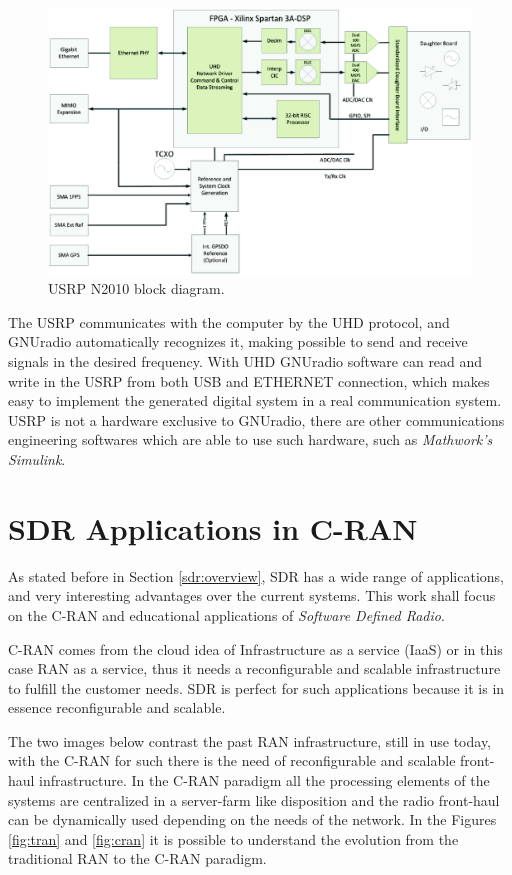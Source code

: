 \begin{figure}[htbp]
    \centering
    \includegraphics[width=.85\textwidth]{./figures/usrp_bd}
    \caption{ USRP N2010 block diagram.
    \label{fig:usrpbd}}
\end{figure}

The USRP communicates with the computer by the UHD protocol, and GNUradio
automatically recognizes it, making possible to send and receive signals in the
desired frequency. With UHD GNUradio software can read and write in the USRP
from both USB and ETHERNET connection, which makes easy to implement the
generated digital system in a real communication system. USRP is not a hardware
exclusive to GNUradio, there are other communications engineering softwares
which are able to use such hardware, such as \textit{Mathwork's Simulink}.

\section{SDR Applications in C-RAN}
\label{sec:sdr_app}

As stated before in Section \ref{sdr:overview}, SDR has a wide range of applications,
and very interesting advantages over the current systems. This work shall focus
on the C-RAN and educational applications of \emph{Software Defined Radio}.

C-RAN comes from the cloud idea of Infrastructure as a service (IaaS) or in this
case RAN as a service, thus it needs a reconfigurable and scalable
infrastructure to fulfill the customer needs. SDR is perfect for such
applications because  it is in essence reconfigurable and scalable.

The two images below contrast the past RAN infrastructure, still in use today,
with the C-RAN for such there is the need of reconfigurable and scalable
front-haul infrastructure. In the C-RAN paradigm all the processing elements of
the systems are centralized in a server-farm like disposition and the radio front-haul
can be dynamically used depending on the needs of the network. In the Figures
\ref{fig:tran} and \ref{fig:cran} it is possible to understand the evolution
from the traditional RAN to the C-RAN paradigm.

